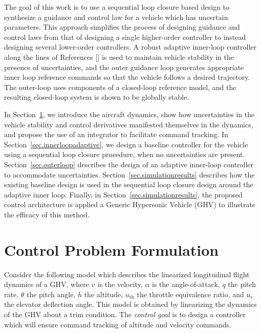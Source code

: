 \documentclass[]{../sty/aiaa-tc}
\theoremstyle{examplestyle}
\begin{document}
  The goal of this work is to use a sequential loop closure based design to synthesize a guidance and control law for a vehicle which has uncertain parameters.
  This approach simplifies the process of designing guidance and control laws from that of designing a single higher-order controller to instead designing several lower-order controllers.
  A robust adaptive inner-loop controller along the lines of References [] is used to maintain vehicle stability in the presence of uncertainties, and the outer guidance loop generates appropriate inner loop reference commands so that the vehicle follows a desired trajectory.
  The outer-loop uses components of a closed-loop reference model, and the resulting closed-loop system is shown to be globally stable.

  In Section~\ref{sec.analysisandclassical}, we introduce the aircraft dynamics, show how uncertainties in the vehicle stability and control derivatives manifested themselves in the dynamics, and propose the use of an integrator to facilitate command tracking.
  In Section~\ref{sec.innerloopadaptive}, we design a baseline controller for the vehicle using a sequential loop closure procedure, when no uncertainties are present.
  Section~\ref{sec.outerloop} describes the design of an adaptive inner-loop controller to accommodate uncertainties.
  Section~\ref{sec.simulationresults} describes how the existing baseline design is used in the sequential loop closure design around the adaptive inner loop.
  Finally, in Section~\ref{sec.simulationresults}, the proposed control architecture is applied a Generic Hypersonic Vehicle (GHV) to illustrate the efficacy of this method.

  \section{Control Problem Formulation}\label{sec.analysisandclassical}

  Consider the following model which describes the linearized longitudinal flight dynamics of a GHV, where $v_{}$ is the velocity, $\alpha$ is the angle-of-attack, $q$ the pitch rate, $\theta$ the pitch angle, $h$ the altitude, $u_{\text{th}}$ the throttle equivalence ratio, and $u_{e}$ the elevator deflection angle.\cite{stengel.flightdynamics.2004}
  This model is obtained by linearizing the dynamics of the GHV about a trim condition.
  The \textit{control goal} is to design a controller which will ensure command tracking of altitude and velocity commands.
\end{document}
